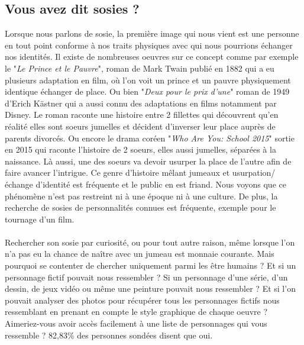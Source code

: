 \documentclass[a4paper,12pt]{article}
\begin{document}
\subsection{Vous avez dit sosies ?}
Lorsque nous parlons de sosie, la première image qui nous vient est une personne en tout point conforme à nos traits physiques avec qui nous pourrions échanger nos identités. Il existe de nombreuses oeuvres sur ce concept comme par exemple le "\textit{Le Prince et le Pauvre}", roman de Mark Twain publié en 1882 qui a eu plusieurs adaptation en film, où l'on voit un prince et un pauvre physiquement identique échanger de place. Ou bien "\textit{Deux pour le prix d'une}" roman de 1949 d'Erich Kästner qui a aussi connu des adaptations en films notamment par Disney. Le roman raconte une histoire entre 2 fillettes qui découvrent qu'en réalité elles sont soeurs jumelles et décident d'inverser leur place auprès de parents divorcés. Ou encore le drama coréen "\textit{Who Are You: School 2015}" sortie en 2015 qui raconte l'histoire de 2 soeurs, elles aussi jumelles, séparées à la naissance. Là aussi, une des soeurs va devoir usurper la place de l'autre afin de faire avancer l'intrigue. Ce genre d'histoire mêlant jumeaux et usurpation/échange d'identité est fréquente et le public en est friand. Nous voyons que ce phénomène n'est pas restreint ni à une époque ni à une culture. De plus, la recherche de sosies de personnalités connues est fréquente, exemple pour le tournage d'un film. 
\\ \\
Rechercher son sosie par curiosité, ou pour tout autre raison, même lorsque l'on n'a pas eu la chance de naître avec un jumeau est monnaie courante. Mais pourquoi se contenter de chercher uniquement parmi les être humains ? Et si un personnage fictif pouvait nous ressembler ? Si un personnage d'une série, d'un dessin, de jeux vidéo ou même une peinture pouvait nous ressembler ? Et si l'on pouvait analyser des photos pour récupérer tous les personnages fictifs nous ressemblant en prenant en compte le style graphique de chaque oeuvre ? Aimeriez-vous avoir accès facilement à une liste de personnages qui vous ressemble ? 82,83\% des personnes sondées disent que oui. 
\\ \\
\end{document}
